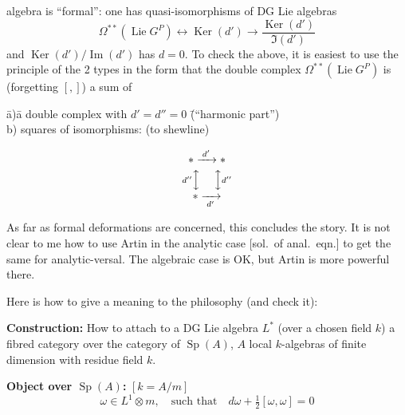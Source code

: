\documentclass[11pt,a4paper]{article}
\DeclareMathOperator{\Sp}{Sp}
\DeclareMathOperator{\Ker}{Ker}
\begin{document}
\newpage

\noindent algebra is ``formal'': one has quasi-isomorphisms of DG Lie algebras
\begin{equation}\label{eq:1}
\Omega^{**}(\operatorname{Lie} G^P) \longleftrightarrow \Ker(d') \longrightarrow \frac{\Ker(d')}{\Im(d')}
\end{equation}
and $\Ker(d')/\operatorname{Im}(d')$ has $d=0$. To check the above, it is easiest to use the principle of the 2 types in the form that the double complex $\Omega^{**}(\operatorname{Lie} G^P)$ is (forgetting $[,]$) a sum of

\vspace{0.2cm}
\begin{tabbing}
\hspace{1cm}\= a)\hspace{0.3cm}\= a double complex with $d'=d''=0$ \hspace{1cm}\= (``harmonic part'')\\[0.2cm]
\> b)\> squares of isomorphisms: \> (to shewline)
\end{tabbing}
\vspace{-0.3cm}
\[
\begin{array}{c}
* \xrightarrow{\;d'\;} * \\[0.1cm]
{\scriptstyle d''}\Big\updownarrow \quad\; \Big\updownarrow{\scriptstyle d''} \\[0.1cm]
* \xrightarrow[\;d'\;]{}
\end{array}
\]

As far as formal deformations are concerned, this concludes the story. It is not clear to me how to use Artin in the analytic case [sol.\ of anal.\ eqn.] to get the same for analytic-versal. The algebraic case is OK, but Artin is more powerful there.

\vspace{0.3cm}

Here is how to give a meaning to the philosophy (and check it):

\vspace{0.2cm}

\noindent\textbf{Construction:} How to attach to a DG Lie algebra $L^*$ (over a chosen field $k$) a fibred category over the category of $\Sp(A)$, $A$ local $k$-algebras of finite dimension with residue field $k$.

\vspace{0.2cm}

\noindent\textbf{Object over $\Sp(A)$:} $[k = A/m]$
\[
\omega \in L^1 \otimes m, \quad \text{such that} \quad d\omega + \tfrac{1}{2}[\omega,\omega] = 0
\]
\end{document}
